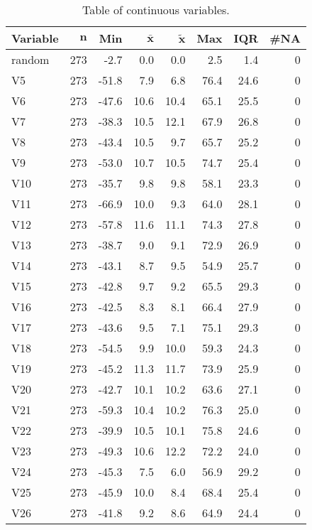 {\footnotesize
\begin{longtable}{lrrrrrrr}
\caption{Table of continuous variables.} \\ 
 \textbf{Variable} & $\mathbf{n}$ & \textbf{Min} & $\mathbf{\bar{x}}$ & $\mathbf{\widetilde{x}}$ & \textbf{Max} & \textbf{IQR} & \textbf{\#NA} \\ 
  \hline \endhead  \hline
random & 273 &  -2.7 &  0.0 &  0.0 &  2.5 &  1.4 & 0 \\ 
  V5 & 273 & -51.8 &  7.9 &  6.8 & 76.4 & 24.6 & 0 \\ 
  V6 & 273 & -47.6 & 10.6 & 10.4 & 65.1 & 25.5 & 0 \\ 
  V7 & 273 & -38.3 & 10.5 & 12.1 & 67.9 & 26.8 & 0 \\ 
  V8 & 273 & -43.4 & 10.5 &  9.7 & 65.7 & 25.2 & 0 \\ 
  V9 & 273 & -53.0 & 10.7 & 10.5 & 74.7 & 25.4 & 0 \\ 
  V10 & 273 & -35.7 &  9.8 &  9.8 & 58.1 & 23.3 & 0 \\ 
  V11 & 273 & -66.9 & 10.0 &  9.3 & 64.0 & 28.1 & 0 \\ 
  V12 & 273 & -57.8 & 11.6 & 11.1 & 74.3 & 27.8 & 0 \\ 
  V13 & 273 & -38.7 &  9.0 &  9.1 & 72.9 & 26.9 & 0 \\ 
  V14 & 273 & -43.1 &  8.7 &  9.5 & 54.9 & 25.7 & 0 \\ 
  V15 & 273 & -42.8 &  9.7 &  9.2 & 65.5 & 29.3 & 0 \\ 
  V16 & 273 & -42.5 &  8.3 &  8.1 & 66.4 & 27.9 & 0 \\ 
  V17 & 273 & -43.6 &  9.5 &  7.1 & 75.1 & 29.3 & 0 \\ 
  V18 & 273 & -54.5 &  9.9 & 10.0 & 59.3 & 24.3 & 0 \\ 
  V19 & 273 & -45.2 & 11.3 & 11.7 & 73.9 & 25.9 & 0 \\ 
  V20 & 273 & -42.7 & 10.1 & 10.2 & 63.6 & 27.1 & 0 \\ 
  V21 & 273 & -59.3 & 10.4 & 10.2 & 76.3 & 25.0 & 0 \\ 
  V22 & 273 & -39.9 & 10.5 & 10.1 & 75.8 & 24.6 & 0 \\ 
  V23 & 273 & -49.3 & 10.6 & 12.2 & 72.2 & 24.0 & 0 \\ 
  V24 & 273 & -45.3 &  7.5 &  6.0 & 56.9 & 29.2 & 0 \\ 
  V25 & 273 & -45.9 & 10.0 &  8.4 & 68.4 & 25.4 & 0 \\ 
  V26 & 273 & -41.8 &  9.2 &  8.6 & 64.9 & 24.4 & 0 \\ 

\end{longtable}}
